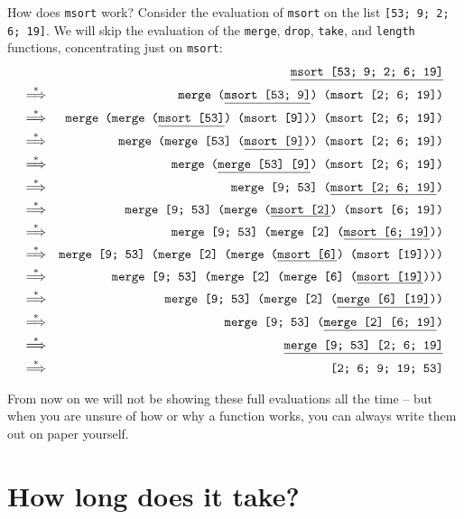 \documentclass[]{book}
\begin{document}
How does \texttt{msort} work? Consider the evaluation of \texttt{msort} on the list \texttt{[53; 9; 2; 6; 19]}. We will skip the evaluation of the \texttt{merge}, \texttt{drop}, \texttt{take}, and \texttt{length} functions, concentrating just on \texttt{msort}:
\begin{eqnarray*}
 & & \underline{\texttt{msort [53; 9; 2; 6; 19]\vphantom{g}}} \\
 \overset{*}\Longrightarrow & & \texttt{merge (\underline{msort [53; 9]\vphantom{g}}) (msort [2; 6; 19])} \\
 \overset{*}\Longrightarrow & & \texttt{merge (merge (\underline{msort [53]\vphantom{g}}) (msort [9])) (msort [2; 6; 19])} \\
\overset{*}\Longrightarrow & & \texttt{merge (merge [53] (\underline{msort [9]\vphantom{g}})) (msort [2; 6; 19])} \\
\overset{*}\Longrightarrow & & \texttt{merge (\underline{merge [53] [9]}) (msort [2; 6; 19])} \\
\overset{*}\Longrightarrow & & \texttt{merge [9; 53] (\underline{msort [2; 6; 19]})} \\
\overset{*}\Longrightarrow & & \texttt{merge [9; 53] (merge (\underline{msort [2]}) (msort [6; 19])} \\
\overset{*}\Longrightarrow & & \texttt{merge [9; 53] (merge [2] (\underline{msort [6; 19]}))} \\
\overset{*}\Longrightarrow & & \texttt{merge [9; 53] (merge [2] (merge (\underline{msort [6]}) (msort [19])))} \\
\overset{*}\Longrightarrow & & \texttt{merge [9; 53] (merge [2] (merge [6] (\underline{msort [19]})))} \\
\overset{*}\Longrightarrow & & \texttt{merge [9; 53] (merge [2] (\underline{merge [6] [19]}))} \\
\overset{*}\Longrightarrow & & \texttt{merge [9; 53] (\underline{merge [2] [6; 19]})} \\
\overset{*}\Longrightarrow & & \texttt{\underline{merge [9; 53] [2; 6; 19]}} \\
\overset{*}\Longrightarrow & & \texttt{[2; 6; 9; 19; 53]}
\end{eqnarray*}

\noindent From now on we will not be showing these full evaluations all the time -- but when you are unsure of how or why a function works, you can always write them out on paper yourself.

\section*{How long does it take?}
\end{document}
